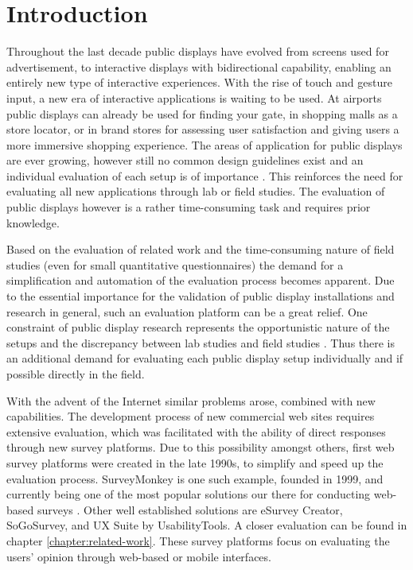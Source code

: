 \section{Introduction}
\label{sec:introduction}

	Throughout the last decade public displays have evolved from screens used for advertisement, to interactive displays with bidirectional capability, enabling an entirely new type of interactive experiences. With the rise of touch and gesture input, a new era of interactive applications is waiting to be used. At airports public displays can already be used for finding your gate, in shopping malls as a store locator, or in brand stores for assessing user satisfaction and giving users a more immersive shopping experience. The areas of application for public displays are ever growing, however still no common design guidelines exist \cite{Alt2012HowToEvaluate} and an individual evaluation of each setup is of importance \cite{muller2010requirements}. This reinforces the need for evaluating all new applications through lab or field studies. The evaluation of public displays however is a rather time-consuming task and requires prior knowledge. 


	Based on the evaluation of related work and the time-consuming nature of field studies (even for small quantitative questionnaires) the demand for a simplification and automation of the evaluation process becomes apparent. Due to the essential importance for the validation of public display installations and research in general, such an evaluation platform can be a great relief. 
	One constraint of public display research represents the opportunistic nature of the setups and the discrepancy between lab studies and field studies \cite{Ojala2011}. Thus there is an additional demand for evaluating each public display setup individually and if possible directly in the field.


	
	With the advent of the Internet similar problems arose, combined with new capabilities. The development process of new commercial web sites requires extensive evaluation, which was facilitated with the ability of direct responses through new survey platforms. Due to this possibility amongst others, first web survey platforms were created in the late 1990s, to simplify and speed up the evaluation process. SurveyMonkey is one such example, founded in 1999, and currently being one of the most popular solutions our there for conducting web-based surveys \cite{SurveyMonkeyAboutUs}. %
	Other well established solutions are eSurvey Creator, SoGoSurvey, and UX Suite by UsabilityTools. A closer evaluation can be found in chapter \ref{chapter:related-work}. These survey platforms focus on evaluating the users' opinion through web-based or mobile interfaces. 



